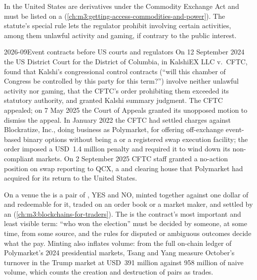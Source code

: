 In the United States  are derivatives under the Commodity Exchange Act and must be listed on a 
(\cref{ch:m3:getting-access-commodities-and-power}). The statute's special rule lets the regulator prohibit  involving certain
activities, among them unlawful activity and gaming, if contrary to the public interest.

\begin{dated}{2026-09}{Event contracts before US courts and regulators}\label{dat:m3:prediction-and-betting-markets:kalshi}
On 12 September 2024 the US District Court for the District of Columbia, in KalshiEX LLC v.\ CFTC, found that Kalshi's congressional control contracts
(``will this chamber of Congress be controlled by this party for this term?'') involve neither unlawful activity nor gaming, that the CFTC's order
prohibiting them exceeded its statutory authority, and granted Kalshi summary judgment. The CFTC appealed; on 7 May 2025 the Court of Appeals granted
its unopposed motion to dismiss the appeal. In January 2022 the CFTC had settled charges against Blockratize, Inc., doing business as Polymarket, for
offering off-exchange event-based binary options without being a  or a registered swap execution facility; the order imposed
a USD~1.4 million penalty and required it to wind down its non-compliant markets. On 2 September 2025 CFTC staff granted a no-action position
on swap reporting to QCX, a  and clearing house that Polymarket had acquired for its return to the United States.
\end{dated}

On a  venue the  is a pair of , YES and NO, minted together against one dollar of  and redeemable for it,
traded on an order book or a market maker, and settled by an  (\cref{ch:m3:blockchains-for-traders}). The  is the contract's
most important and least visible term: ``who won the election'' must be decided by someone, at some time, from some source, and the rules for disputed
or ambiguous outcomes decide what the  pay. Minting also inflates volume: from the full on-chain ledger of Polymarket's 2024 presidential
markets, Tsang and Yang measure October's turnover in the Trump market at USD~391 million against 958 million of naive volume, which counts
the creation and destruction of pairs as trades.

